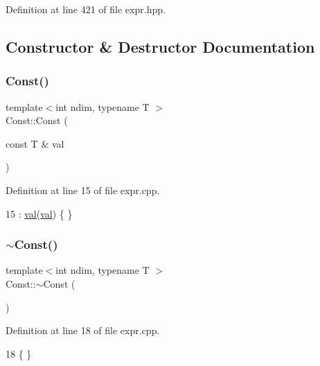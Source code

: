 Definition at line 421 of file expr.\+hpp.



\subsection{Constructor \& Destructor Documentation}
\hypertarget{classshark_1_1ndim_1_1_const_a7045f6e927528a3abf82182f0c894be2}{}\label{classshark_1_1ndim_1_1_const_a7045f6e927528a3abf82182f0c894be2} 
\subsubsection{\texorpdfstring{Const()}{Const()}}
{\footnotesize\ttfamily template$<$int ndim, typename T $>$ \\
Const\+::\+Const (\begin{DoxyParamCaption}\item[{const T \&}]{val }\end{DoxyParamCaption})}



Definition at line 15 of file expr.\+cpp.


\begin{DoxyCode}
15 : \hyperlink{classshark_1_1ndim_1_1_const_aa7b1fd3a202063f3c8d08d75a890e4b0}{val}(\hyperlink{classshark_1_1ndim_1_1_const_aa7b1fd3a202063f3c8d08d75a890e4b0}{val}) \{ \}
\end{DoxyCode}
\hypertarget{classshark_1_1ndim_1_1_const_a458fd0ff9671ebb6bba2e54247753126}{}\label{classshark_1_1ndim_1_1_const_a458fd0ff9671ebb6bba2e54247753126} 
\subsubsection{\texorpdfstring{$\sim$\+Const()}{~Const()}}
{\footnotesize\ttfamily template$<$int ndim, typename T $>$ \\
Const\+::$\sim$\+Const (\begin{DoxyParamCaption}{ }\end{DoxyParamCaption})}



Definition at line 18 of file expr.\+cpp.


\begin{DoxyCode}
18 \{ \}
\end{DoxyCode}


